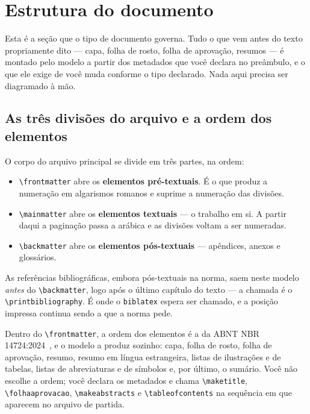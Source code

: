 \chapter{Estrutura do documento}\label{cap:estrutura}

Esta é a seção que o tipo de documento governa. Tudo o que vem antes do texto propriamente dito ---
capa, folha de rosto, folha de aprovação, resumos --- é montado pelo modelo a partir dos metadados
que você declara no preâmbulo, e o que ele exige de você muda conforme o tipo declarado. Nada aqui
precisa ser diagramado à mão.

\section{As três divisões do arquivo e a ordem dos elementos}\label{sec:divisoes-arquivo}

O corpo do arquivo principal se divide em três partes, na ordem:

\begin{itemize}
    \item \verb|\frontmatter| abre os \textbf{elementos pré-textuais}. É o que produz a numeração em
          algarismos romanos e suprime a numeração das divisões.
    \item \verb|\mainmatter| abre os \textbf{elementos textuais} --- o trabalho em si. A partir daqui
          a paginação passa a arábica e as divisões voltam a ser numeradas.
    \item \verb|\backmatter| abre os \textbf{elementos pós-textuais} --- apêndices, anexos e
          glossários.
\end{itemize}

As referências bibliográficas, embora pós-textuais na norma, saem neste modelo \emph{antes} do
\verb|\backmatter|, logo após o último capítulo do texto --- a chamada é o
\texttt{\textbackslash printbibliography}. É onde o \texttt{biblatex} espera ser chamado, e a posição impressa continua
sendo a que a norma pede.

Dentro do \verb|\frontmatter|, a ordem dos elementos é a da ABNT NBR
14724:2024~\cite{nbr14724:2024}, e o modelo a produz sozinho: capa, folha de rosto, folha de
aprovação, resumo, resumo em língua estrangeira, listas de ilustrações e de tabelas, listas de
abreviaturas e de símbolos e, por último, o sumário. Você não escolhe a ordem; você declara os
metadados e chama \verb|\maketitle|, \verb|\folhaaprovacao|, \verb|\makeabstracts| e
\verb|\tableofcontents| na sequência em que aparecem no arquivo de partida.

